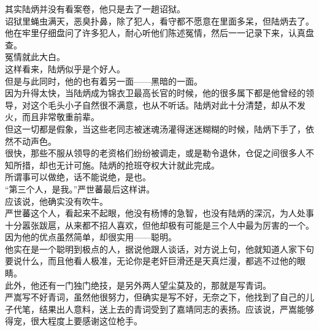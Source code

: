 \begin{multicols}{\theparacolNo}
其实陆炳并没有看案卷，他只是去了一趟诏狱。\\

诏狱里蝇虫满天，恶臭扑鼻，除了犯人，看守都不愿意在里面多呆，但陆炳去了。\\

他在牢里仔细盘问了许多犯人，耐心听他们陈述冤情，然后一一记录下来，认真盘查。\\

冤情就此大白。\\

这样看来，陆炳似乎是个好人。\\

但是与此同时，他的也有着另一面——黑暗的一面。\\

因为升得太快，当陆炳成为锦衣卫最高长官的时候，他的很多属下都是他曾经的领导，对这个毛头小子自然很不满意，也从不听话。陆炳对此十分清楚，却从不发火，而且非常敬重前辈。\\

但这一切都是假象，当这些老同志被迷魂汤灌得迷迷糊糊的时候，陆炳下手了，依然不动声色。\\

很快，那些不服从领导的老资格们纷纷被调走，或是勒令退休，仓促之间很多人不知所措，却也无计可施。陆炳的抢班夺权大计就此完成。\\

所谓事可以做绝，话不能说绝，是也。\\

“第三个人，是我。”严世蕃最后这样讲。\\

应该说，他确实没有吹牛。\\

严世蕃这个人，看起来不起眼，他没有杨博的急智，也没有陆炳的深沉，为人处事十分嚣张跋扈，从来都不招人喜欢，但他却极有可能是三个人中最为厉害的一个。\\

因为他的优点虽然简单，却很实用——聪明。\\

他实在是一个聪明到极点的人，据说他跟人谈话，对方说上句，他就知道人家下句要说什么，而且他看人极准，无论你是老奸巨滑还是天真烂漫，都逃不过他的眼睛。\\

此外，他还有一门独门绝技，是另外两人望尘莫及的，那就是写青词。\\

严嵩写不好青词，虽然他很努力，但确实是写不好，无奈之下，他找到了自己的儿子代笔，结果出人意料，送上去的青词受到了嘉靖同志的表扬。应该说，严嵩能够得宠，很大程度上要感谢这位枪手。\\


\end{multicols}

